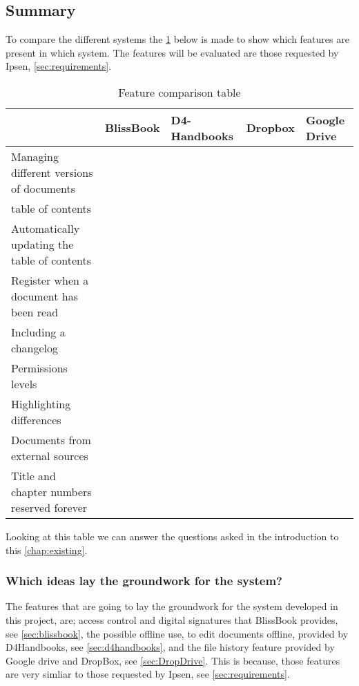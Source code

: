 \subsection{Summary}
To compare the different systems the \cref{tab:Exsisting} below is made to show which features are present in which system.
The features will be evaluated are those requested by Ipsen, \cref{sec:requirements}.

\begin{table}[H]
	\begin{center}
		\begin{tabular}{| m{5cm}|m{1.6cm}|m{2cm}|m{1.5cm}|m{1.2cm}|}
			\hline
			& BlissBook  & D4-Handbooks & Dropbox & Google \newline Drive \\
			\hline
			Managing different versions of documents & \checkmark &  &  & \checkmark \\
			\hline
			table of contents & \checkmark & \checkmark  & & \\
			\hline
			Automatically updating the table of contents & \checkmark & \checkmark  &  & \\
			\hline
			Register when a document has been read & \checkmark & \checkmark &  & \\
			\hline
			Including a changelog & \checkmark & \checkmark  &  & \\
			\hline
			Permissions levels & \checkmark &  & \checkmark & \checkmark \\
			\hline
			Highlighting differences & \checkmark &  &  & \checkmark\\
			\hline
			Documents from external \newline sources &  &  & \checkmark & \checkmark \\
			\hline
			Title and chapter numbers \newline reserved forever &  &  &  & \\
			\hline
		\end{tabular}
		\caption{Feature comparison table}\label{tab:Exsisting}
	\end{center}
\end{table}

Looking at this table we can answer the questions asked in the introduction to this \cref{chap:existing}.

\subsubsection*{Which ideas lay the groundwork for the system?}
The features that are going to lay the groundwork for the system developed in this project, are; access control and digital signatures that BlissBook provides, see \cref{sec:blissbook}, the possible offline use, to edit documents offline, provided by D4Handbooks, see \cref{sec:d4handbooks}, and the file history feature provided by Google drive and DropBox, see \cref{sec:DropDrive}.
This is because, those features are very simliar to those requested by Ipsen, see \cref{sec:requirements}.

